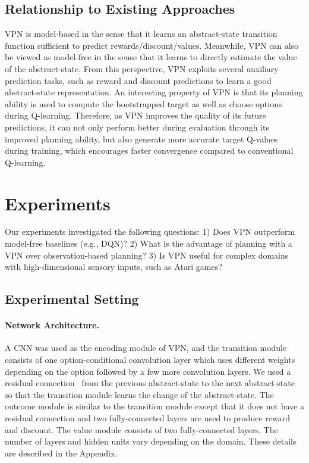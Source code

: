\documentclass{article}
\newcommand{\supplementary}{Appendix}
\newcommand{\cutsectionup}{\vspace*{-0.05in}}
\newcommand{\cutsectiondown}{\vspace*{-0.03in}}
\newcommand{\cutsubsectionup}{\vspace*{-0.04in}}
\newcommand{\cutsubsectiondown}{\vspace*{-0.03in}}
\begin{document}
\cutsubsectionup
\subsection{Relationship to Existing Approaches}\label{sec:relationship}
\cutsubsectiondown
VPN is model-based in the sense that it learns an abstract-state transition function sufficient to predict rewards/discount/values. Meanwhile, VPN can also be viewed as model-free in the sense that it learns to directly estimate the value of the abstract-state. From this perspective, VPN exploits several auxiliary prediction tasks, such as reward and discount predictions to learn a good abstract-state representation. 
An interesting property of VPN is that its planning ability is used to compute the bootstrapped target as well as choose options during Q-learning. Therefore, as VPN improves the quality of its future predictions, it can not only perform better during evaluation through its improved planning ability, but also generate more accurate target Q-values during training, which encourages faster convergence compared to conventional Q-learning.

\cutsectionup
\section{Experiments}
\cutsectiondown
Our experiments investigated the following questions: 1) Does VPN outperform model-free baselines (e.g., DQN)? 2) What is the advantage of planning with a VPN over observation-based planning? 3) Is VPN useful for complex domains with high-dimensional sensory inputs, such as Atari games?




\cutsectionup
\subsection{Experimental Setting} \label{exp:setting}
\cutsectiondown
\paragraph{Network Architecture.} 
A CNN was used as the encoding module of VPN, and the transition module consists of one option-conditional convolution layer which uses different weights depending on the option followed by a few more convolution layers. We used a residual connection~\citep{He2016DeepRL} from the previous abstract-state to the next abstract-state so that the transition module learns the change of the abstract-state. The outcome module is similar to the transition module except that it does not have a residual connection and two fully-connected layers are used to produce reward and discount. The value module consists of two fully-connected layers. The number of layers and hidden units vary depending on the domain. These details are described in the \supplementary.
\end{document}
